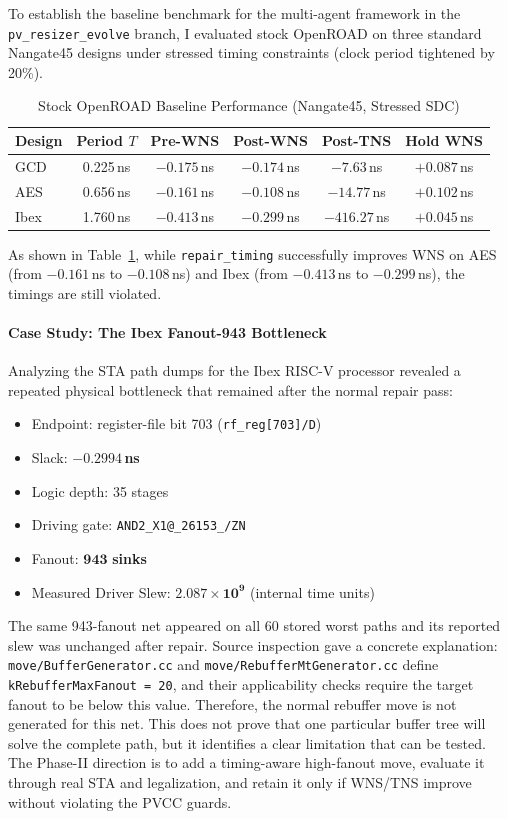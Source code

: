 \documentclass[10pt, conference]{IEEEtran}
\begin{document}
To establish the baseline benchmark for the multi-agent framework in the \texttt{pv\_resizer\_evolve} branch, I evaluated stock OpenROAD on three standard Nangate45 designs under stressed timing constraints (clock period tightened by 20\%).

\begin{table}[t]
\centering
\caption{Stock OpenROAD Baseline Performance (Nangate45, Stressed SDC)}
\label{tab:baseline}
\small
\begin{tabular}{@{}lccccc@{}}
\toprule
\textbf{Design} & \textbf{Period $T$} & \textbf{Pre-WNS} & \textbf{Post-WNS} & \textbf{Post-TNS} & \textbf{Hold WNS} \\
\midrule
GCD   & 0.225\,ns & $-0.175$\,ns & $-0.174$\,ns & $-7.63$\,ns  & $+0.087$\,ns \\
AES   & 0.656\,ns & $-0.161$\,ns & $-0.108$\,ns & $-14.77$\,ns & $+0.102$\,ns \\
Ibex  & 1.760\,ns & $-0.413$\,ns & $-0.299$\,ns & $-416.27$\,ns & $+0.045$\,ns \\
\bottomrule
\end{tabular}
\end{table}

As shown in Table~\ref{tab:baseline}, while \texttt{repair\_timing} successfully improves WNS on AES (from $-0.161$\,ns to $-0.108$\,ns) and Ibex (from $-0.413$\,ns to $-0.299$\,ns), the timings are still violated.

\paragraph{Case Study: The Ibex Fanout-943 Bottleneck}
Analyzing the STA path dumps for the Ibex RISC-V processor revealed a repeated physical bottleneck that remained after the normal repair pass:
\begin{itemize}
  \item Endpoint: register-file bit 703 (\texttt{rf\_reg[703]/D})
  \item Slack: $\mathbf{-0.2994}$\,\textbf{ns}
  \item Logic depth: 35 stages
  \item Driving gate: \texttt{AND2\_X1@\_26153\_/ZN}
  \item Fanout: $\mathbf{943}$ \textbf{sinks}
  \item Measured Driver Slew: $\mathbf{2.087 \times 10^9}$ (internal time units)
\end{itemize}

The same 943-fanout net appeared on all 60 stored worst paths and its reported slew was unchanged after repair. Source inspection gave a concrete explanation: \texttt{move/BufferGenerator.cc} and \texttt{move/RebufferMtGenerator.cc} define \texttt{kRebufferMaxFanout = 20}, and their applicability checks require the target fanout to be below this value. Therefore, the normal rebuffer move is not generated for this net. This does not prove that one particular buffer tree will solve the complete path, but it identifies a clear limitation that can be tested. The Phase-II direction is to add a timing-aware high-fanout move, evaluate it through real STA and legalization, and retain it only if WNS/TNS improve without violating the PVCC guards.
\end{document}
